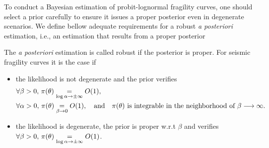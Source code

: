 To conduct a Bayesian estimation of probit-lognormal fragility curves, one should select a prior carefully to ensure it issues a proper posterior even in degenerate scenarios. We define bellow adequate requirements for a robust \emph{a posteriori} estimation, i.e., an estimation that results from a proper posterior

\begin{defi}\label{def:doe:robust-estimation}
    The \emph{a posteriori} estimation is called robust if the posterior is proper. For  seismic fragility curves it is the case if 
    \begin{itemize}
        \item the likelihood is not degenerate and the prior verifies
            \begin{align*}
                &\forall\beta>0,\,\pi(\theta)\overset{}{\underset{\log\alpha\rightarrow\pm\infty}{=}}O(1),\\
                & \forall\alpha>0,\,\pi(\theta)\overset{}{\underset{\beta\rightarrow0}{=}} O(1),\quad\text{and}\quad \pi(\theta)\ \text{is integrable in the neighborhood of $\beta\longrightarrow\infty$.}
            \end{align*}
        \item the likelihood is degenerate, the prior is proper w.r.t $\beta$ and verifies $\forall\beta>0,\, \pi(\theta)\overset{}{\underset{\log\alpha\rightarrow\pm\infty}{=}}O(1)$.
    \end{itemize}
\end{defi}


